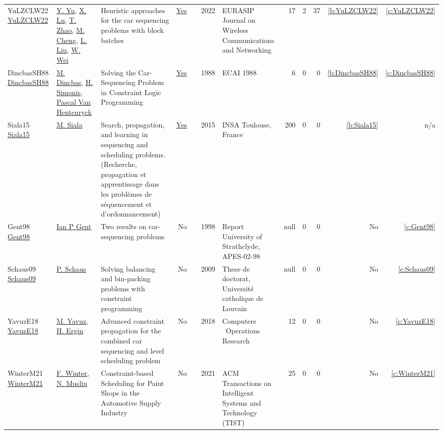 {\begin{longtable}{>{\raggedright\arraybackslash}p{3cm}>{\raggedright\arraybackslash}p{6cm}>{\raggedright\arraybackslash}p{6.5cm}rrrp{2.5cm}rrrrr}
YuLZCLW22 \href{http://dx.doi.org/10.1186/s13638-022-02113-7}{YuLZCLW22} & \hyperref[auth:a55]{Y. Yu}, \hyperref[auth:a56]{X. Lu}, \hyperref[auth:a57]{T. Zhao}, \hyperref[auth:a58]{M. Cheng}, \hyperref[auth:a59]{L. Liu}, \hyperref[auth:a60]{W. Wei} & Heuristic approaches for the car sequencing problems with block batches & \href{../cars/works/YuLZCLW22.pdf}{Yes} & \cite{YuLZCLW22} & 2022 & EURASIP Journal on Wireless Communications and Networking & 17 & 2 & 37 & \ref{b:YuLZCLW22} & \ref{c:YuLZCLW22}\\
DincbasSH88 \href{}{DincbasSH88} & \hyperref[auth:a2]{M. Dincbas}, \hyperref[auth:a3]{H. Simonis}, \hyperref[auth:a4]{Pascal Van Hentenryck} & Solving the Car-Sequencing Problem in Constraint Logic Programming & \href{../cars/works/DincbasSH88.pdf}{Yes} & \cite{DincbasSH88} & 1988 & ECAI 1988 & 6 & 0 & 0 & \ref{b:DincbasSH88} & \ref{c:DincbasSH88}\\
Siala15 \href{https://tel.archives-ouvertes.fr/tel-01164291}{Siala15} & \hyperref[auth:a11]{M. Siala} & Search, propagation, and learning in sequencing and scheduling problems. (Recherche, propagation et apprentissage dans les probl{\`{e}}mes de s{\'{e}}quencement et d'ordonnancement) & \href{../cars/works/Siala15.pdf}{Yes} & \cite{Siala15} & 2015 & {INSA} Toulouse, France & 200 & 0 & 0 & \ref{b:Siala15} & n/a\\
Gent98 \href{}{Gent98} & \hyperref[auth:a18]{Ian P Gent} & Two results on car-sequencing problems & No & \cite{Gent98} & 1998 & Report University of Strathclyde, APES-02-98 & null & 0 & 0 & No & \ref{c:Gent98}\\
Schaus09 \href{}{Schaus09} & \hyperref[auth:a19]{P. Schaus} & Solving balancing and bin-packing problems with constraint programming & No & \cite{Schaus09} & 2009 & These de doctorat, Universit{\'e} catholique de Louvain & null & 0 & 0 & No & \ref{c:Schaus09}\\
YavuzE18 \href{}{YavuzE18} & \hyperref[auth:a22]{M. Yavuz}, \hyperref[auth:a23]{H. Ergin} & Advanced constraint propagation for the combined car sequencing and level scheduling problem & No & \cite{YavuzE18} & 2018 & Computers \  Operations Research & 12 & 0 & 0 & No & \ref{c:YavuzE18}\\
WinterM21 \href{}{WinterM21} & \hyperref[auth:a24]{F. Winter}, \hyperref[auth:a25]{N. Musliu} & Constraint-based Scheduling for Paint Shops in the Automotive Supply Industry & No & \cite{WinterM21} & 2021 & ACM Transactions on Intelligent Systems and Technology (TIST) & 25 & 0 & 0 & No & \ref{c:WinterM21}\\

\end{longtable}}
